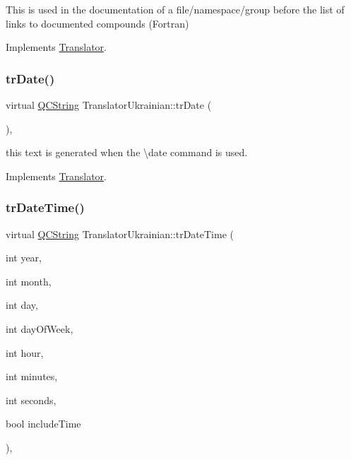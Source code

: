 This is used in the documentation of a file/namespace/group before the list of links to documented compounds (Fortran) 

Implements \mbox{\hyperlink{class_translator}{Translator}}.

\mbox{\label{class_translator_ukrainian_a8bae133f680a379eba7c2e6fd7901055}} 
\subsubsection{\texorpdfstring{trDate()}{trDate()}}
{\footnotesize\ttfamily virtual \mbox{\hyperlink{class_q_c_string}{Q\+C\+String}} Translator\+Ukrainian\+::tr\+Date (\begin{DoxyParamCaption}{ }\end{DoxyParamCaption})\hspace{0.3cm}{\ttfamily [inline]}, {\ttfamily [virtual]}}

this text is generated when the \textbackslash{}date command is used. 

Implements \mbox{\hyperlink{class_translator}{Translator}}.

\mbox{\label{class_translator_ukrainian_ac2d3cc1b86b956c0e90f6f22216f046e}} 
\subsubsection{\texorpdfstring{trDateTime()}{trDateTime()}}
{\footnotesize\ttfamily virtual \mbox{\hyperlink{class_q_c_string}{Q\+C\+String}} Translator\+Ukrainian\+::tr\+Date\+Time (\begin{DoxyParamCaption}\item[{int}]{year,  }\item[{int}]{month,  }\item[{int}]{day,  }\item[{int}]{day\+Of\+Week,  }\item[{int}]{hour,  }\item[{int}]{minutes,  }\item[{int}]{seconds,  }\item[{bool}]{include\+Time }\end{DoxyParamCaption})\hspace{0.3cm}{\ttfamily [inline]}, {\ttfamily [virtual]}}

